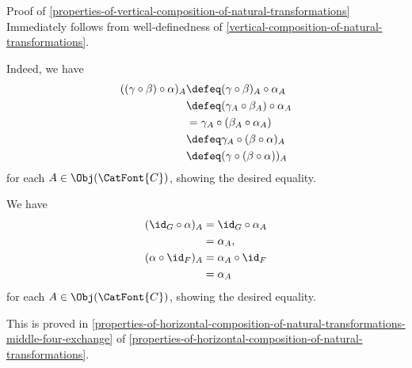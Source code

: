 \begin{Proof}{Proof of \cref{properties-of-vertical-composition-of-natural-transformations}}%
    Immediately follows from well-definedness of \cref{vertical-composition-of-natural-transformations}.

    Indeed, we have
    \begin{align*}
        ((\gamma\circ\beta)\circ\alpha)_{A} &\defeq (\gamma\circ\beta)_{A}\circ\alpha_{A}\\
                                            &\defeq (\gamma_{A}\circ\beta_{A})\circ\alpha_{A}\\
                                            &=      \gamma_{A}\circ(\beta_{A}\circ\alpha_{A})\\
                                            &\defeq \gamma_{A}\circ(\beta\circ\alpha)_{A}\\
                                            &\defeq (\gamma\circ(\beta\circ\alpha))_{A}
    \end{align*}
    for each $A\in\Obj(\CatFont{C})$, showing the desired equality.

    We have
    \begin{align*}
        (\id_{G}\circ\alpha)_{A} &= \id_{G}\circ\alpha_{A}\\
                                 &= \alpha_{A},\\
        (\alpha\circ\id_{F})_{A} &= \alpha_{A}\circ\id_{F}\\
                                 &= \alpha_{A}
    \end{align*}
    for each $A\in\Obj(\CatFont{C})$, showing the desired equality.

    This is proved in \cref{properties-of-horizontal-composition-of-natural-transformations-middle-four-exchange} of \cref{properties-of-horizontal-composition-of-natural-transformations}.
\end{Proof}
